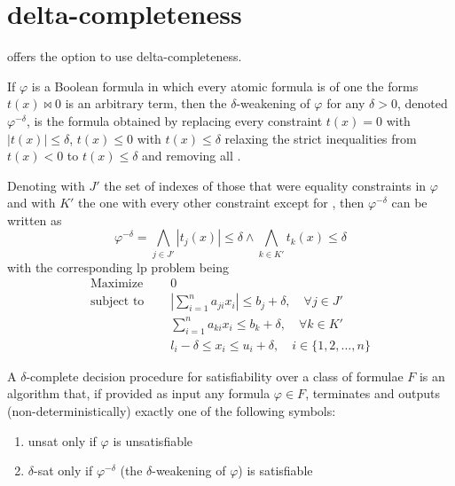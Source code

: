 \documentclass[runningheads]{llncs}
\begin{document}
\section{delta-completeness}
\label{sec:delta-completeness}

\dlinear offers the option to use delta-completeness.

\begin{definition}
    If $\varphi$ is a Boolean formula in which every atomic formula is of one the forms $t(x) \bowtie 0$ is an arbitrary term, then the $\delta$-weakening of $\varphi$ for any $\delta > 0$, denoted $\varphi^{-\delta}$, is the formula obtained by replacing every constraint $t(x) = 0$ with $|t(x)| \le \delta$, $t(x) \le 0$ with $t(x) \le \delta$ relaxing the strict inequalities from $t(x) < 0$ to $t(x) \le \delta$ and removing all \nqcs.
\end{definition}
Denoting with $J'$ the set of indexes of those that were equality constraints in $\varphi$ and with $K'$ the one with every other constraint except for \nqcs, then $\varphi^{-\delta}$ can be written as
\begin{equation*}
    \varphi^{-\delta} = \bigwedge_{j \in J'} |t_j(x)| \le \delta \wedge \bigwedge_{k \in K'} t_k(x) \le \delta
\end{equation*}
with the corresponding \gls{lp} problem being
\begin{equation}
    \label{eq:delta-lp}
    \begin{split}
        \text{Maximize }   \quad & 0                                                                                \\
        \text{subject to } \quad & \left|\sum_{i=1}^{n} a_{ji}x_{i}\right| \le b_j + \delta, \quad \forall j \in J' \\
        \quad                    & \sum_{i=1}^{n} a_{ki}x_{i} \le b_k + \delta, \quad \forall k \in K'              \\
        \quad                    & l_i - \delta \le x_i \le u_i + \delta,  \quad i \in \{1, 2, \ldots, n\}
    \end{split}
\end{equation}
\begin{definition}
    A $\delta$-complete decision procedure for satisfiability over a class of formulae $F$ is an algorithm that, if provided as input any formula $\varphi \in F$, terminates and outputs (non-deterministically) exactly one of the following symbols:
    \begin{enumerate}
        \item unsat only if $\varphi$ is unsatisfiable
        \item $\delta$-sat only if $\varphi^{-\delta}$ (the $\delta$-weakening of $\varphi$) is satisfiable
    \end{enumerate}
\end{definition}
\end{document}
